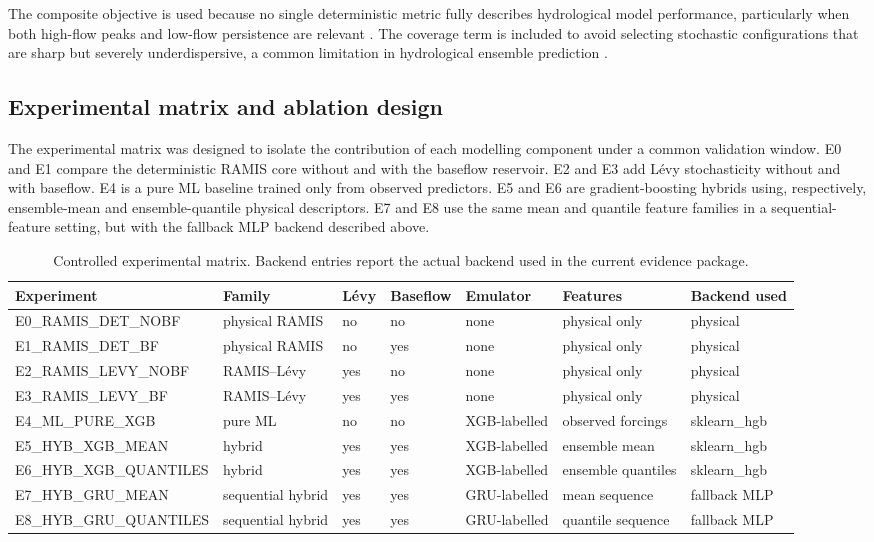 \documentclass[a4paper,fleqn]{cas-sc}
\begin{document}
The composite objective is used because no single deterministic metric
fully describes hydrological model performance, particularly when both
high-flow peaks and low-flow persistence are relevant
\citep{pushpalatha2012review}. The coverage term is included to avoid
selecting stochastic configurations that are sharp but severely
underdispersive, a common limitation in hydrological ensemble
prediction \citep{franz2011evaluating,abaza2017incidence}.

\subsection{Experimental matrix and ablation design}\label{subsec:matrix}

The experimental matrix was designed to isolate the contribution of each
modelling component under a common validation window. E0 and E1 compare
the deterministic RAMIS core without and with the baseflow reservoir.
E2 and E3 add L\'{e}vy stochasticity without and with baseflow. E4 is a
pure ML baseline trained only from observed predictors. E5 and E6 are
gradient-boosting hybrids using, respectively, ensemble-mean and
ensemble-quantile physical descriptors. E7 and E8 use the same mean and
quantile feature families in a sequential-feature setting, but with the
fallback MLP backend described above.

\begin{table}[t]
\caption{Controlled experimental matrix. Backend entries report the
actual backend used in the current evidence package.}
\label{tab:experiment-matrix}
\centering
\small
\begin{tabular*}{\textwidth}{@{\extracolsep{\fill}}lllllll@{}}
\toprule
Experiment & Family & L\'{e}vy & Baseflow & Emulator & Features
  & Backend used \\
\midrule
E0\_RAMIS\_DET\_NOBF   & physical RAMIS & no  & no  & none
  & physical only & physical \\
E1\_RAMIS\_DET\_BF     & physical RAMIS & no  & yes & none
  & physical only & physical \\
E2\_RAMIS\_LEVY\_NOBF  & RAMIS--L\'{e}vy & yes & no  & none
  & physical only & physical \\
E3\_RAMIS\_LEVY\_BF    & RAMIS--L\'{e}vy & yes & yes & none
  & physical only & physical \\
E4\_ML\_PURE\_XGB      & pure ML        & no  & no  & XGB-labelled
  & observed forcings & sklearn\_hgb \\
E5\_HYB\_XGB\_MEAN     & hybrid         & yes & yes & XGB-labelled
  & ensemble mean & sklearn\_hgb \\
E6\_HYB\_XGB\_QUANTILES & hybrid        & yes & yes & XGB-labelled
  & ensemble quantiles & sklearn\_hgb \\
E7\_HYB\_GRU\_MEAN     & sequential hybrid & yes & yes & GRU-labelled
  & mean sequence & fallback MLP \\
E8\_HYB\_GRU\_QUANTILES & sequential hybrid & yes & yes & GRU-labelled
  & quantile sequence & fallback MLP \\
\bottomrule
\end{tabular*}
\end{table}
\end{document}
